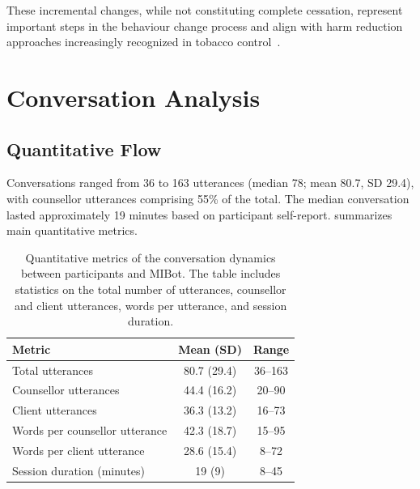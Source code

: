 These incremental changes, while not constituting complete cessation, represent important steps in the behaviour change process and align with harm reduction approaches increasingly recognized in tobacco control~\citep{Abrams2018}.

\section{Conversation Analysis}
\label{sec:conversation-analysis}

\subsection*{Quantitative Flow}
\label{sec:conversation-dynamics}

Conversations ranged from 36 to 163 utterances (median 78; mean 80.7, SD 29.4), with counsellor utterances comprising 55\% of the total. The median conversation lasted approximately 19 minutes based on participant self-report.  summarizes main quantitative metrics.

\begin{table}[ht]
	\centering
	\small
	\setlength{\tabcolsep}{4pt}
	\renewcommand{\arraystretch}{1.1}
	\begin{tabular}{@{}lcc@{}}
		\toprule
		\textbf{Metric}                & \textbf{Mean (SD)} & \textbf{Range} \\
		\midrule
		Total utterances               & 80.7 (29.4)        & 36--163        \\
		Counsellor utterances          & 44.4 (16.2)        & 20--90         \\
		Client utterances              & 36.3 (13.2)        & 16--73         \\
		Words per counsellor utterance & 42.3 (18.7)        & 15--95         \\
		Words per client utterance     & 28.6 (15.4)        & 8--72          \\
		Session duration (minutes)     & 19 (9)             & 8--45          \\
		\bottomrule
	\end{tabular}
	\caption[Conversation Dynamics between Participants and MIBot: Quantitative Metrics]{Quantitative metrics of the conversation dynamics between participants and MIBot. The table includes statistics on the total number of utterances, counsellor and client utterances, words per utterance, and session duration.}
	\label{table:conversation_metrics}
\end{table}

